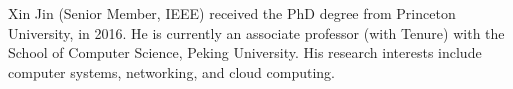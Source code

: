 %

\begin{IEEEbiography}{Xin Jin}
(Senior Member, IEEE) received the PhD degree from Princeton University, in 2016. He is currently an associate professor (with Tenure) with the School of Computer Science, Peking University. His research interests include computer systems, networking, and cloud computing.
\end{IEEEbiography}
  
